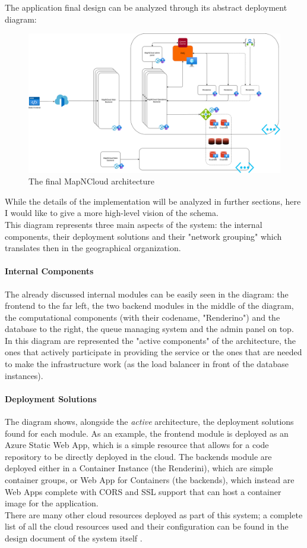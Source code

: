 The application final design can be analyzed through its abstract deployment diagram:
\begin{figure}[H]
  \centering
  \includegraphics[width = \textwidth]{../Images/SystemDesign-Final.drawio.png}
  \caption{The final MapNCloud architecture}
\end{figure}
While the details of the implementation will be analyzed in further sections, here I would like to give a more high-level vision of the schema.\\
This diagram represents three main aspects of the system: the internal components, their deployment solutions and their "network grouping" which translates then in the geographical organization.

\paragraph{Internal Components}
  The already discussed internal modules can be easily seen in the diagram: the frontend to the far left, the two backend modules in the middle of the diagram, the computational components (with their codename, "Renderino") and the database to the right, the queue managing system and the admin panel on top. In this diagram are represented the "active components" of the architecture, the ones that actively participate in providing the service or the ones that are needed to make the infrastructure work (as the load balancer in front of the database instances).

\paragraph{Deployment Solutions}
  The diagram shows, alongside the \textit{active} architecture, the deployment solutions found for each module. As an example, the frontend module is deployed as an Azure Static Web App, which is a simple resource that allows for a code repository to be directly deployed in the cloud. The backends module are deployed either in a Container Instance (the Renderini), which are simple container groups, or Web App for Containers (the backends), which instead are Web Apps complete with CORS and SSL support that can host a container image for the application.\\
  There are many other cloud resources deployed as part of this system; a complete list of all the cloud resources used and their configuration can be found in the design document of the system itself \cite{MNCDesignDoc}.


